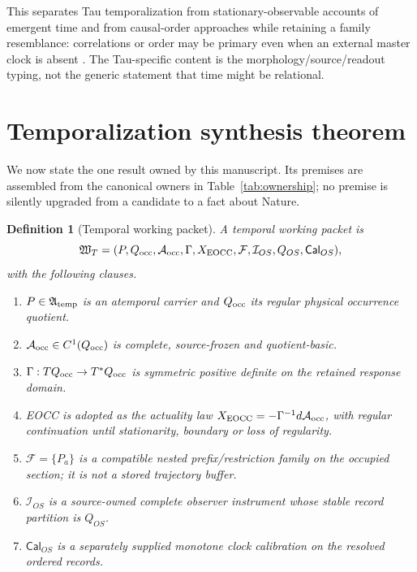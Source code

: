 \documentclass[11pt]{article}
\newtheorem{definition}{Definition}
\newcommand{\At}{\mathfrak A}
\begin{document}
This separates Tau temporalization from stationary-observable accounts of
emergent time and from causal-order approaches while retaining a family
resemblance: correlations or order may be primary even when an external
master clock is absent \citep{PageWootters1983,ConnesRovelli1994,Rovelli2004,Bombelli1987}.
The Tau-specific content is the morphology/source/readout typing, not the
generic statement that time might be relational.

\section{Temporalization synthesis theorem}

We now state the one result owned by this manuscript.  Its premises are
assembled from the canonical owners in Table~\ref{tab:ownership}; no premise
is silently upgraded from a candidate to a fact about Nature.

\begin{definition}[Temporal working packet]
A temporal working packet is
\begin{equation}
 \mathfrak W_T=
 (P,Q_{\rm occ},\mathcal A_{\rm occ},\Gamma,
  X_{\rm EOCC},\mathcal F,\mathcal I_{OS},Q_{OS},\mathsf{Cal}_{OS}),
 \label{eq:working-packet}
\end{equation}
with the following clauses.
\begin{enumerate}[label=(S\arabic*)]
\item \(P\in\At_{\rm temp}\) is an atemporal carrier and
      \(Q_{\rm occ}\) its regular physical occurrence quotient.
\item \(\mathcal A_{\rm occ}\in C^1(Q_{\rm occ})\) is complete,
      source-frozen and quotient-basic.
\item \(\Gamma:TQ_{\rm occ}\to T^*Q_{\rm occ}\) is symmetric positive
      definite on the retained response domain.
\item EOCC is adopted as the actuality law
      \(X_{\rm EOCC}=-\Gamma^{-1}d\mathcal A_{\rm occ}\), with regular
      continuation until stationarity, boundary or loss of regularity.
\item \(\mathcal F=\{P_a\}\) is a compatible nested prefix/restriction
      family on the occupied section; it is not a stored trajectory buffer.
\item \(\mathcal I_{OS}\) is a source-owned complete observer instrument
      whose stable record partition is \(Q_{OS}\).
\item \(\mathsf{Cal}_{OS}\) is a separately supplied monotone clock
      calibration on the resolved ordered records.
\end{enumerate}
\end{definition}
\end{document}
